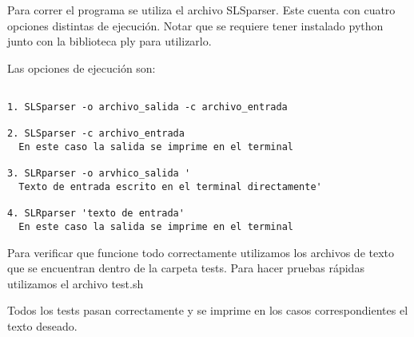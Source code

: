 Para correr el programa se utiliza el archivo SLSparser. Este cuenta con cuatro opciones distintas de ejecución. Notar que se requiere tener instalado python junto con la biblioteca ply para utilizarlo.

Las opciones de ejecución son:

\begin{verbatim}

1. SLSparser -o archivo_salida -c archivo_entrada

2. SLSparser -c archivo_entrada 
  En este caso la salida se imprime en el terminal

3. SLRparser -o arvhico_salida '
  Texto de entrada escrito en el terminal directamente'

4. SLRparser 'texto de entrada'
  En este caso la salida se imprime en el terminal

\end{verbatim}

Para verificar que funcione todo correctamente utilizamos los archivos de texto que se encuentran dentro de la carpeta tests. Para hacer pruebas rápidas utilizamos el archivo test.sh

Todos los tests pasan correctamente y se imprime en los casos correspondientes el texto deseado.